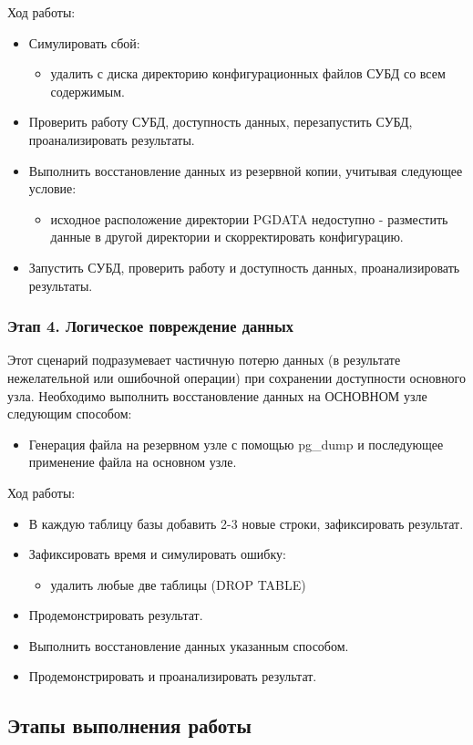 \documentclass{article}
\begin{document}
Ход работы:
    \begin{itemize}
        \item Симулировать сбой:
            \begin{itemize}
                \item удалить с диска директорию конфигурационных файлов СУБД со всем содержимым.
            \end{itemize}
        \item Проверить работу СУБД, доступность данных, перезапустить СУБД, проанализировать результаты.
        \item Выполнить восстановление данных из резервной копии, учитывая следующее условие:
            \begin{itemize}
                \item исходное расположение директории PGDATA недоступно - разместить данные в другой директории и скорректировать конфигурацию.
            \end{itemize}
        \item Запустить СУБД, проверить работу и доступность данных, проанализировать результаты.
    \end{itemize}
\subsubsection{Этап 4. Логическое повреждение данных}
Этот сценарий подразумевает частичную потерю данных (в результате нежелательной или ошибочной операции) при сохранении доступности основного узла. Необходимо выполнить восстановление данных на ОСНОВНОМ узле следующим способом:
    \begin{itemize}
        \item Генерация файла на резервном узле с помощью pg\_dump и последующее применение файла на основном узле.
    \end{itemize}
Ход работы:
\begin{itemize}
    \item В каждую таблицу базы добавить 2-3 новые строки, зафиксировать результат.
    \item Зафиксировать время и симулировать ошибку:
        \begin{itemize}
            \item удалить любые две таблицы (DROP TABLE)
        \end{itemize}
    \item Продемонстрировать результат.
    \item Выполнить восстановление данных указанным способом.
    \item Продемонстрировать и проанализировать результат.
\end{itemize}
\subsection{Этапы выполнения работы}
\end{document}
